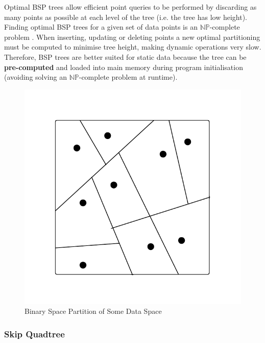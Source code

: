 Optimal BSP trees allow efficient point queries to be performed by discarding as many points as possible at each level of the tree (i.e. the tree has low height). Finding optimal BSP trees for a given set of data points is an $\mathbb{NP}$-complete problem \cite{bsp-np-hard}. When inserting, updating or deleting points a new optimal partitioning must be computed to minimise tree height, making dynamic operations very slow. Therefore, BSP trees are better suited for static data because the tree can be \textbf{pre-computed} and loaded into main memory during program initialisation (avoiding solving an $\mathbb{NP}$-complete problem at runtime).

\begin{figure}
	\vspace{-40pt}
	\begin{center}
		\includegraphics[scale=0.4]{figures/bsp_tree.pdf}
	\end{center}
	\vspace{-30pt}
	\caption{Binary Space Partition of Some Data Space}
	\label{fig:bsp}
\end{figure}

\subsubsection{Skip Quadtree}


